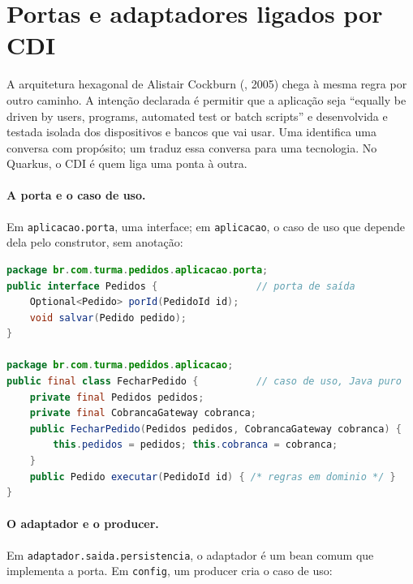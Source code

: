 \section{Portas e adaptadores ligados por CDI}
\label{sec:hexagonal-cdi}

A arquitetura hexagonal de Alistair Cockburn
(, 2005) chega à mesma regra por
outro caminho. A intenção declarada é permitir que a aplicação seja
\enquote{equally be driven by users, programs, automated test or batch
scripts} e desenvolvida e testada isolada dos dispositivos e bancos que
vai usar. Uma  identifica uma conversa com propósito;
um  traduz essa
conversa para uma tecnologia. No Quarkus, o CDI é quem liga uma ponta à
outra.

\paragraph{A porta e o caso de uso.}
Em \texttt{aplicacao.porta}, uma interface; em \texttt{aplicacao}, o
caso de uso que depende dela pelo construtor, sem anotação:

\begin{lstlisting}[language=Java]
package br.com.turma.pedidos.aplicacao.porta;
public interface Pedidos {                 // porta de saída
    Optional<Pedido> porId(PedidoId id);
    void salvar(Pedido pedido);
}

package br.com.turma.pedidos.aplicacao;
public final class FecharPedido {          // caso de uso, Java puro
    private final Pedidos pedidos;
    private final CobrancaGateway cobranca;
    public FecharPedido(Pedidos pedidos, CobrancaGateway cobranca) {
        this.pedidos = pedidos; this.cobranca = cobranca;
    }
    public Pedido executar(PedidoId id) { /* regras em dominio */ }
}
\end{lstlisting}

\paragraph{O adaptador e o producer.}
Em \texttt{adaptador.saida.persistencia}, o adaptador é um bean comum que
implementa a porta. Em \texttt{config}, um producer cria o caso de uso:

